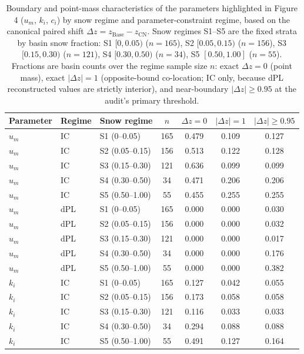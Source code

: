 \begin{table}[t]
\centering
\caption{Boundary and point-mass characteristics of the parameters highlighted in Figure 4 ($u_m$, $k_i$, $c_i$) by snow regime and parameter-constraint regime, based on the canonical paired shift $\Delta z = z_{\mathrm{Base}} - z_{\mathrm{CN}}$. Snow regimes S1--S5 are the fixed strata by basin snow fraction: S1 $[0, 0.05)$ ($n=165$), S2 $[0.05, 0.15)$ ($n=156$), S3 $[0.15, 0.30)$ ($n=121$), S4 $[0.30, 0.50)$ ($n=34$), S5 $[0.50, 1.00]$ ($n=55$). Fractions are basin counts over the regime sample size $n$: exact $\Delta z = 0$ (point mass), exact $|\Delta z| = 1$ (opposite-bound co-location; IC only, because dPL reconstructed values are strictly interior), and near-boundary $|\Delta z| \ge 0.95$ at the audit's primary threshold.}
\label{tab:tables5_boundary_point_mass}
\begin{threeparttable}
\begin{tabular}{lllcccc}
\toprule
Parameter & Regime & Snow regime & $n$ & $\Delta z = 0$ & $|\Delta z| = 1$ & $|\Delta z| \ge 0.95$ \\
\midrule
$u_m$ & IC & S1 (0–0.05) & 165 & 0.479 & 0.109 & 0.127 \\
$u_m$ & IC & S2 (0.05–0.15) & 156 & 0.513 & 0.122 & 0.128 \\
$u_m$ & IC & S3 (0.15–0.30) & 121 & 0.636 & 0.099 & 0.099 \\
$u_m$ & IC & S4 (0.30–0.50) & 34 & 0.471 & 0.206 & 0.206 \\
$u_m$ & IC & S5 (0.50–1.00) & 55 & 0.455 & 0.255 & 0.255 \\
$u_m$ & dPL & S1 (0–0.05) & 165 & 0.000 & 0.000 & 0.030 \\
$u_m$ & dPL & S2 (0.05–0.15) & 156 & 0.000 & 0.000 & 0.032 \\
$u_m$ & dPL & S3 (0.15–0.30) & 121 & 0.000 & 0.000 & 0.017 \\
$u_m$ & dPL & S4 (0.30–0.50) & 34 & 0.000 & 0.000 & 0.176 \\
$u_m$ & dPL & S5 (0.50–1.00) & 55 & 0.000 & 0.000 & 0.382 \\
$k_i$ & IC & S1 (0–0.05) & 165 & 0.127 & 0.042 & 0.055 \\
$k_i$ & IC & S2 (0.05–0.15) & 156 & 0.173 & 0.058 & 0.058 \\
$k_i$ & IC & S3 (0.15–0.30) & 121 & 0.116 & 0.033 & 0.033 \\
$k_i$ & IC & S4 (0.30–0.50) & 34 & 0.294 & 0.088 & 0.088 \\
$k_i$ & IC & S5 (0.50–1.00) & 55 & 0.491 & 0.127 & 0.164 \\

\end{tabular}
\end{threeparttable}
\end{table}
